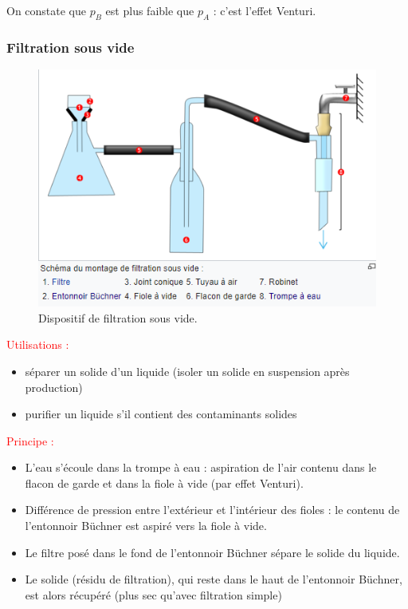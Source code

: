 \documentclass[11pt,a4paper]{report}
\begin{document}
On constate que $p_B$ est plus faible que $p_A$ : c'est l'effet Venturi.

\subsubsection{Filtration sous vide}
	\begin{figure}[h!]
	\begin{center}
		\includegraphics[scale = 0.5]{filtration_vide.png}
		\caption{Dispositif de filtration sous vide.} 
		\label{fig:filtration_vide}
	\end{center}
	\end{figure}

\textcolor{red}{Utilisations :}
\begin{itemize}
	\item séparer un solide d'un liquide (isoler un solide en suspension après production)
	\item purifier un liquide s'il contient des contaminants solides
\end{itemize}

\textcolor{red}{Principe :}
\begin{itemize}
	\item L'eau s'écoule dans la trompe à eau : aspiration de l'air contenu dans le flacon de garde et dans la fiole à vide (par effet Venturi).
	\item Différence de pression entre l'extérieur et l'intérieur des fioles : le contenu de l'entonnoir Büchner est aspiré vers la fiole à vide.
	\item Le filtre posé dans le fond de l'entonnoir Büchner sépare le solide du liquide.
	\item Le solide (résidu de filtration), qui reste dans le haut de l'entonnoir Büchner, est alors récupéré (plus sec qu'avec filtration simple)
\end{itemize}
\end{document}
